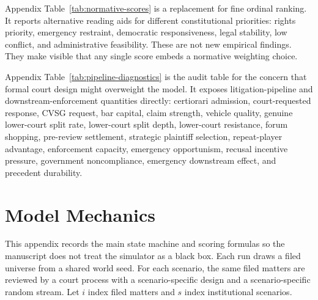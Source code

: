 \documentclass[
    journal=jlc,
    manuscript=research-article,
    year=2026,
  ]{cup-journal}
\begin{document}




Appendix Table~\ref{tab:normative-scores} is a replacement for fine ordinal ranking. It reports alternative reading aids for different constitutional priorities: rights priority, emergency restraint, democratic responsiveness, legal stability, low conflict, and administrative feasibility. These are not new empirical findings. They make visible that any single score embeds a normative weighting choice.



Appendix Table~\ref{tab:pipeline-diagnostics} is the audit table for the concern that formal court design might overweight the model. It exposes litigation-pipeline and downstream-enforcement quantities directly: certiorari admission, court-requested response, CVSG request, bar capital, claim strength, vehicle quality, genuine lower-court split rate, lower-court split depth, lower-court resistance, forum shopping, pre-review settlement, strategic plaintiff selection, repeat-player advantage, enforcement capacity, emergency opportunism, recusal incentive pressure, government noncompliance, emergency downstream effect, and precedent durability.

\section{Model Mechanics}
\label{app:mechanics}

This appendix records the main state machine and scoring formulas so the manuscript does not treat the simulator as a black box. Each run draws a filed universe from a shared world seed. For each scenario, the same filed matters are reviewed by a court process with a scenario-specific design and a scenario-specific random stream. Let $i$ index filed matters and $s$ index institutional scenarios.
\end{document}
